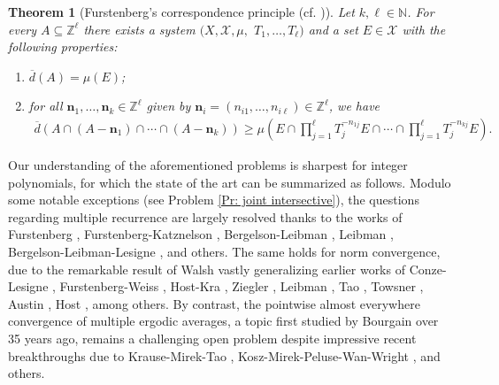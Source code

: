 \documentclass[11pt]{amsart}
\newtheorem{theorem}[lemma]{Theorem}
\theoremstyle{definition}
\newcommand{\N}{{\mathbb N}}
\newcommand{\Z}{{\mathbb Z}}
\newcommand{\CX}{{\mathcal X}}
\newcommand{\bn}{{\mathbf{n}}}
\newcommand{\1}{{\mathbf{1}}}
\newcommand{\brac}[1]{\mathopen{}\left( #1 \mathclose{}\right)}
\newcommand{\BK}[1]{{\color{Apricot}{{#1}}}}
\begin{document}
\begin{theorem}[Furstenberg's correspondence principle (cf. {\cite[Theorem 1.1]{Ber87b}})]
   Let $k,\ell\in\N$. For every $A\subseteq\Z^\ell$ there exists a system $(X, \CX, \mu,$\! $T_1, \ldots, T_\ell)$ and a set $E\in\CX$ with the following properties:
   \begin{enumerate}
       \item $\overline{d}(A) = \mu(E)$;
       \item for all $\bn_1, \ldots, \bn_k\in\Z^\ell$ given by $\bn_i = (n_{i1}, \ldots, n_{i\ell})\in\Z^\ell$, we have
       \begin{align*}
           \overline{d}\brac{A\cap (A-\bn_1)\cap \cdots \cap (A-\bn_k)}\geq \mu(E\cap \prod_{j=1}^\ell T_j^{-n_{1j}}E\cap \cdots \cap \prod_{j=1}^\ell T_j^{-n_{kj}}E).
       \end{align*}
   \end{enumerate}
\end{theorem}

Our understanding of the aforementioned problems is sharpest for integer polynomials, for which the state of the art can be summarized as follows. Modulo some notable exceptions (see Problem \ref{Pr: joint intersective}), the questions regarding multiple recurrence are largely resolved thanks to the works of Furstenberg \cite{Fu77}, Furstenberg-Katznelson \cite{FuKa78}, Bergelson-Leibman \cite{BL96}, Leibman \cite{L98}, Bergelson-Leibman-Lesigne \cite{BLL08}, and others.
The same holds for norm convergence, due to the remarkable result of Walsh \cite{W12} vastly generalizing earlier works of Conze-Lesigne \cite{CL84}, Furstenberg-Weiss \cite{FW96}, Host-Kra \cite{HK05b, HK05a}, Ziegler \cite{Z07}, Leibman \cite{L05a}, Tao \cite{T08}, Towsner \cite{To09}, Austin \cite{A10b}, Host \cite{H09}, among others.
By contrast, the pointwise almost everywhere convergence of multiple ergodic averages, a topic first studied by Bourgain \cite{Bo90} over 35 years ago, remains a challenging open problem despite impressive recent breakthroughs due to Krause-Mirek-Tao \cite{KMT20}, Kosz-Mirek-Peluse-Wan-Wright \cite{KMPWW24}, and others. 

\end{document}
